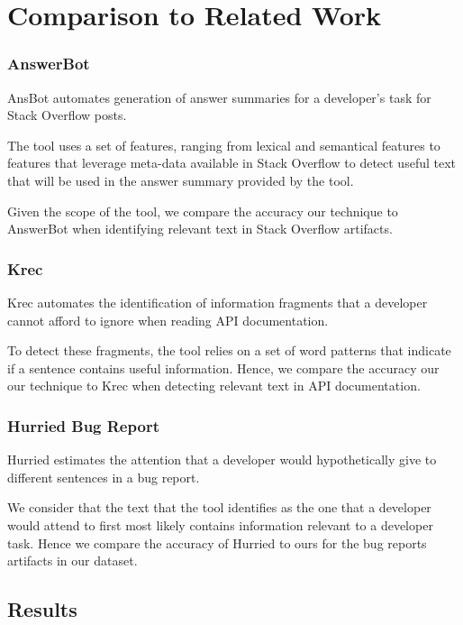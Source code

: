 \section{Comparison to Related Work}
\label{cp5:comparison}



\subsubsection{AnswerBot}


\acf{AnsBot} automates generation of answer summaries for a developer's task for Stack Overflow posts.

The tool uses a set of features, ranging from lexical and semantical features to features that leverage meta-data available in Stack Overflow to detect useful text that will be used in the answer summary provided by the tool. 

Given the scope of the tool, we compare the accuracy our technique to AnswerBot when identifying relevant text in 
Stack Overflow artifacts.


\subsubsection{Krec}


\acf{Krec} automates the identification of information fragments that a developer cannot afford to ignore when reading API documentation.

To detect these fragments, the tool relies on a set of word patterns that indicate if a sentence contains useful information. Hence, we compare the accuracy our our technique to Krec when detecting relevant text in API documentation.


\subsubsection{Hurried Bug Report}


\acf{Hurried} estimates the attention that a developer would hypothetically give to different sentences in a bug report. 


We consider that the text that the tool identifies as the one that a developer would attend to first most likely contains information relevant to a developer task. Hence we compare the accuracy of \acf{Hurried} to ours for the bug reports artifacts in our dataset.


\subsection{Results}
